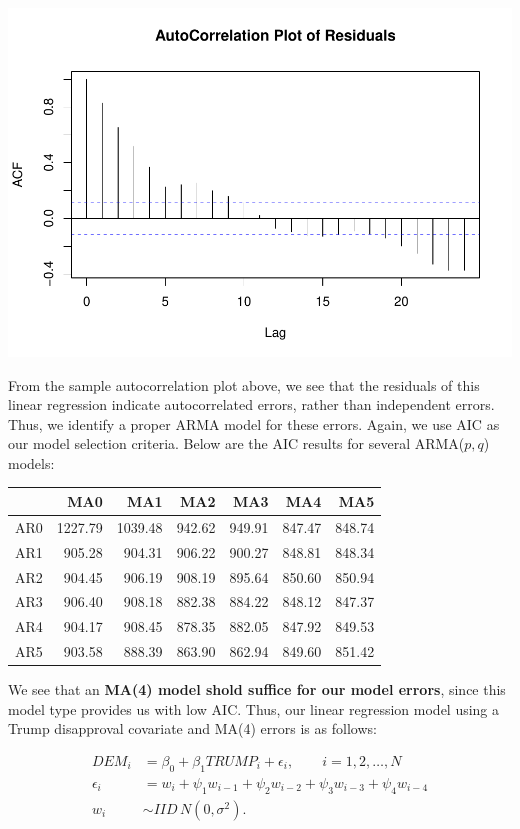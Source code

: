 \documentclass[]{article}
\begin{document}
\begin{center}\includegraphics{midterm_project_final_files/figure-latex/linreg-1} \end{center}

From the sample autocorrelation plot above, we see that the residuals of
this linear regression indicate autocorrelated errors, rather than
independent errors. Thus, we identify a proper ARMA model for these
errors. Again, we use AIC as our model selection criteria. Below are the
AIC results for several ARMA(\(p,q\)) models:

\begin{longtable}[]{@{}lrrrrrr@{}}
\toprule
& MA0 & MA1 & MA2 & MA3 & MA4 & MA5\tabularnewline
\midrule
\endhead
 AR0 & 1227.79 & 1039.48 & 942.62 & 949.91 & 847.47 &
848.74\tabularnewline
 AR1 & 905.28 & 904.31 & 906.22 & 900.27 & 848.81 &
848.34\tabularnewline
 AR2 & 904.45 & 906.19 & 908.19 & 895.64 & 850.60 &
850.94\tabularnewline
 AR3 & 906.40 & 908.18 & 882.38 & 884.22 & 848.12 &
847.37\tabularnewline
 AR4 & 904.17 & 908.45 & 878.35 & 882.05 & 847.92 &
849.53\tabularnewline
 AR5 & 903.58 & 888.39 & 863.90 & 862.94 & 849.60 &
851.42\tabularnewline
\bottomrule
\end{longtable}

We see that an \textbf{MA(4) model shold suffice for our model errors},
since this model type provides us with low AIC. Thus, our linear
regression model using a Trump disapproval covariate and MA(4) errors is
as follows:

\begin{align*}
DEM_i &= \beta_0 +  \beta_1TRUMP_i + \epsilon_i,\qquad i=1,2,\dots ,N\\
\epsilon_i &= w_i + \psi_1w_{i-1} + \psi_2 w_{i-2} + \psi_3 w_{i-3} + \psi_4 w_{i-4}\\
w_i &\sim IID\, N(0,\sigma^2).
\end{align*}
\end{document}
